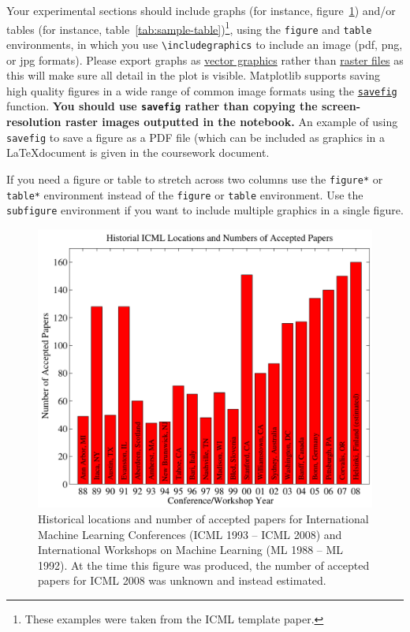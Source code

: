 \documentclass{article}
\begin{document}
Your experimental sections should include graphs (for instance, figure~\ref{fig:sample-graph}) and/or tables (for instance, table~\ref{tab:sample-table})\footnote{These examples were taken from the ICML template paper.}, using the \verb+figure+ and \verb+table+ environments, in which you use \verb+\includegraphics+ to include an image (pdf, png, or jpg formats).  Please export graphs as 
\href{https://en.wikipedia.org/wiki/Vector_graphics}{vector graphics}
rather than \href{https://en.wikipedia.org/wiki/Raster_graphics}{raster
files} as this will make sure all detail in the plot is visible.
Matplotlib supports saving high quality figures in a wide range of
common image formats using the
\href{http://matplotlib.org/api/pyplot_api.html\#matplotlib.pyplot.savefig}{\texttt{savefig}}
function. \textbf{You should use \texttt{savefig} rather than copying
the screen-resolution raster images outputted in the notebook.} An
example of using \texttt{savefig} to save a figure as a PDF file (which
can be included as graphics in a \LaTeX document is given in the coursework document.

If you need a figure or table to stretch across two columns use the \verb+figure*+ or \verb+table*+ environment instead of the \verb+figure+ or \verb+table+ environment.  Use the \verb+subfigure+ environment if you want to include multiple graphics in a single figure.

\begin{figure}[tb]
\vskip 5mm
\begin{center}
\centerline{\includegraphics[width=\columnwidth]{icml_numpapers}}
\caption{Historical locations and number of accepted papers for International
  Machine Learning Conferences (ICML 1993 -- ICML 2008) and
  International Workshops on Machine Learning (ML 1988 -- ML
  1992). At the time this figure was produced, the number of
  accepted papers for ICML 2008 was unknown and instead estimated.}
\label{fig:sample-graph}
\end{center}
\vskip -5mm
\end{figure} 
\end{document}
